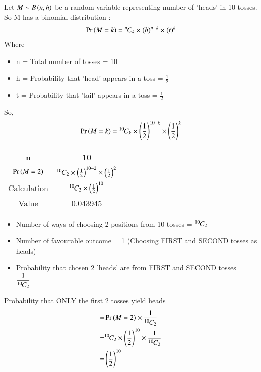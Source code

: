 Let $M \sim B\left(n,h\right)$ be a random variable representing number of 'heads' in 10 tosses.
So M has a binomial distribution :
\begin{align}
    \pr{M=k} = \comb{n}{k} \times (h)^{n-k} \times (t)^{k}\label{0.0.1}
\end{align}
Where
\begin{itemize}
    \item n = Total number of tosses = 10
    \item h = Probability that 'head' appears in a toss = \( \frac{1}{2} \)
    \item t = Probability that 'tail' appears in a toss = \( \frac{1}{2} \)
\end{itemize}
\bigskip
So,
\begin{align}
    \pr{M=k} = \comb{10}{k} \times \brak{\frac{1}{2}}^{10-k} \times \brak{\frac{1}{2}}^{k}\label{0.0.2}
\end{align}
\begin{table}[!ht]
    \begin{center}
        \small
        \resizebox{\columnwidth}{!}
        {
            \begin{tabular}{|c|c|}
                \hline
                n            & 10                                                                            \\
                \hline
                $\Pr\left(M = 2\right)$ & ${{}^{10}\mkern-1muC_{2}} \times \left(\frac{1}{2}\right)^{10-2} \times \left(\frac{1}{2}\right)^{2}$ \\
                \hline
                Calculation  & ${{}^{10}\mkern-1muC_{2}} \times \left(\frac{1}{2}\right)^{10}$                                 \\
                \hline
                Value        & 0.043945                                                                      \\
                \hline
            \end{tabular}
        }
    \end{center}
\end{table}
\begin{itemize}
    \item Number of ways of choosing 2 positions from 10 tosses = ${{}^{10}\mkern-1muC_{2}}$
          \bigskip
    \item Number of favourable outcome = 1 (Choosing FIRST and SECOND tosses as heads)
          \bigskip
    \item Probability that chosen 2 'heads' are from FIRST and SECOND tosses = \(\displaystyle \frac{1}{{{}^{10}\mkern-1muC_{2}}}\)
          \bigskip
\end{itemize}
Probability that ONLY the first 2 tosses yield heads
\begin{align}
    = & \Pr\left(M = 2\right) \times \displaystyle \frac{1}{{{}^{10}\mkern-1muC_{2}}}                    \\
    = & {{}^{10}\mkern-1muC_{2}} \times \left(\frac{1}{2}\right)^{10} \times \frac{1}{{{}^{10}\mkern-1muC_{2}}} \\
    = & \left(\frac{1}{2}\right)^{10}
\end{align}